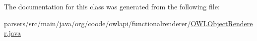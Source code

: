 The documentation for this class was generated from the following file\-:\begin{DoxyCompactItemize}
\item 
parsers/src/main/java/org/coode/owlapi/functionalrenderer/\hyperlink{parsers_2src_2main_2java_2org_2coode_2owlapi_2functionalrenderer_2_o_w_l_object_renderer_8java}{O\-W\-L\-Object\-Renderer.\-java}\end{DoxyCompactItemize}
